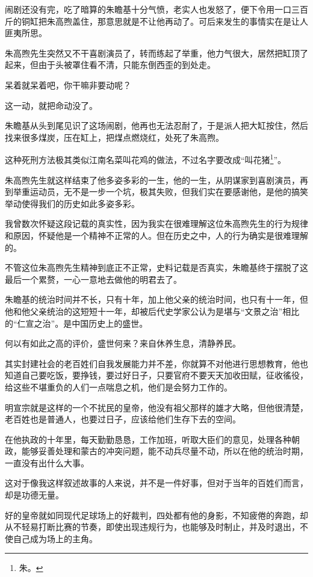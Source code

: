\begin{multicols}{\theparacolNo}
闹剧还没有完，吃了暗算的朱瞻基十分气愤，老实人也发怒了，便下令用一口三百斤的铜缸把朱高煦盖住，那意思就是不让他再动了。可后来发生的事情实在是让人匪夷所思。

朱高煦先生突然又不干喜剧演员了，转而练起了举重，他力气很大，居然把缸顶了起来，但由于头被罩住看不清，只能东倒西歪的到处走。

呆着就呆着吧，你干嘛非要动呢？

这一动，就把命动没了。

朱瞻基从头到尾见识了这场闹剧，他再也无法忍耐了，于是派人把大缸按住，然后找来很多煤炭，压在缸上，把煤点燃烧红，处死了朱高煦。

这种死刑方法极其类似江南名菜叫花鸡的做法，不过名字要改成“叫花猪\footnote{朱。}”。

朱高煦先生就这样结束了他多姿多彩的一生，他的一生，从阴谋家到喜剧演员，再到举重运动员，无不是一步一个坑，极其失败，但我们实在要感谢他，是他的搞笑举动使得我们的历史如此多姿多彩。

我曾数次怀疑这段记载的真实性，因为我实在很难理解这位朱高煦先生的行为规律和原因，怀疑他是一个精神不正常的人。但在历史之中，人的行为确实是很难理解的。

不管这位朱高煦先生精神到底正不正常，史料记载是否真实，朱瞻基终于摆脱了这最后一个累赘，一心一意地去做他的明君去了。

朱瞻基的统治时间并不长，只有十年，加上他父亲的统治时间，也只有十一年，但他和他父亲统治的这短短十一年，却被后代史学家公认为是堪与“文景之治”相比的“仁宣之治”。是中国历史上的盛世。

何以有如此之高的评价，盛世何来？来自休养生息，清静养民。

其实封建社会的老百姓们自我发展能力并不差，你就算不对他进行思想教育，他也知道自己要吃饭，要挣钱，要过好日子，只要官府不要天天加收田赋，征收徭役，给这些不堪重负的人们一点喘息之机，他们是会努力工作的。

明宣宗就是这样的一个不扰民的皇帝，他没有祖父那样的雄才大略，但他很清楚，老百姓也是普通人，也要过日子，应该给他们生存下去的空间。

在他执政的十年里，每天勤勤恳恳，工作加班，听取大臣们的意见，处理各种朝政，能够妥善处理和蒙古的冲突问题，能不动兵尽量不动，所以在他的统治时期，一直没有出什么大事。

这对于像我这样叙述故事的人来说，并不是一件好事，但对于当年的百姓们而言，却是功德无量。

好的皇帝就如同现代足球场上的好裁判，四处都有他的身影，不知疲倦的奔跑，却从不轻易打断比赛的节奏，即使出现违规行为，也能够及时制止，并及时退出，不使自己成为场上的主角。


\end{multicols}
